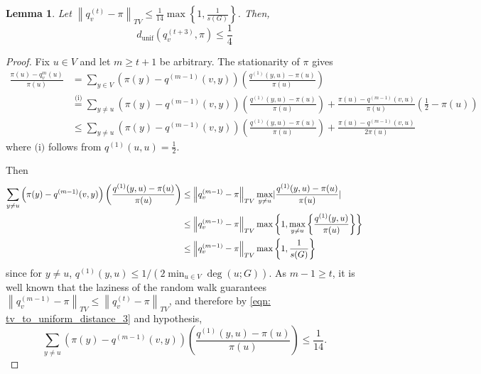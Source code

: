 \documentclass[11pt,twoside]{article}
\newtheorem{lemma}{Lemma}
\DeclarePairedDelimiter\abs{\lvert}{\rvert}
\newcommand{\set}[1]{\left\{#1\right\}}
\newcommand{\norm}[1]{\left\lVert#1\right\rVert}
\newcommand{\1}{\mathbf{1}}
\begin{document}
\begin{lemma}
	\label{lem: tv_to_uniform_distance}
	Let $\norm{q_v^{(t)} - \pi}_{TV} \leq \frac{1}{14} \max \set{1, \frac{1}{s(G)}}$. Then,
	\begin{equation*}
	d_{\mathrm{unif}}(q_v^{(t + 3)},\pi) \leq \frac{1}{4}
	\end{equation*}
\end{lemma}
\begin{proof}
	Fix $u \in V$ and let $m \geq t + 1$ be arbitrary. The stationarity of $\pi$ gives
	\begin{align}
	\frac{\pi(u) - q_v^{m}(u)}{\pi(u)} & = \sum_{y \in V} \left(\pi(y) - q^{(m-1)}(v,y)\right) \left(\frac{q^{(1)}(y,u) - \pi(u)}{\pi(u)}\right) \nonumber \\
	& \overset{\text{(i)}}{=} \sum_{y \neq u} \left(\pi(y) - q^{(m-1)}(v,y)\right) \left(\frac{q^{(1)}(y,u) - \pi(u)}{\pi(u)}\right) + \frac{\pi(u) - q^{(m - 1)}(v,u)}{\pi(u)} \left(\frac{1}{2} - \pi(u)\right) \nonumber \\
	& \leq \sum_{y \neq u} \left(\pi(y) - q^{(m-1)}(v,y)\right) \left(\frac{q^{(1)}(y,u) - \pi(u)}{\pi(u)}\right) + \frac{\pi(u) - q^{(m - 1)}(v,u)}{2 \pi(u)} \label{eqn: tv_to_uniform_distance_1}
	\end{align}
	where $\text{(i)}$ follows from $q^{(1)}(u,u) = \frac{1}{2}$. 
	
	Then 
	\begin{align}
	\sum_{y \neq u} \left(\pi(y) - q^{(m-1)}(v,y)\right) \left(\frac{q^{(1)}(y,u) - \pi(u)}{\pi(u)}\right) & \leq \norm{q_v^{(m-1)} - \pi}_{TV} \max_{y \neq u} \abs{\frac{q^{(1)}(y,u) - \pi(u)}{\pi(u)}} \nonumber \\
	& \leq \norm{q_v^{(m-1)} - \pi}_{TV} \max \set{1, \max_{y \neq u}\set{\frac{q^{(1)}(y,u)}{\pi(u)}}} \nonumber \\
	& \leq \norm{q_v^{(m-1)} - \pi}_{TV} \max \set{1, \frac{1}{s(G)}} \label{eqn: tv_to_uniform_distance_3}
	\end{align}
	since for $y \neq u$, $q^{(1)}(y,u) \leq 1/\left(2 \min_{u \in V} \deg(u; G)\right)$. As $m - 1 \geq t$, it is well known \cite{lovasz1990} that the laziness of the random walk guarantees $\norm{q_v^{(m - 1)} - \pi}_{TV} \leq \norm{q_v^{(t)} - \pi}_{TV}$, and therefore by \eqref{eqn: tv_to_uniform_distance_3} and hypothesis,
	\begin{equation*}
	\sum_{y \neq u} \left(\pi(y) - q^{(m-1)}(v,y)\right) \left(\frac{q^{(1)}(y,u) - \pi(u)}{\pi(u)}\right) \leq \frac{1}{14}.
	\end{equation*}
	

\end{proof}
\end{document}
